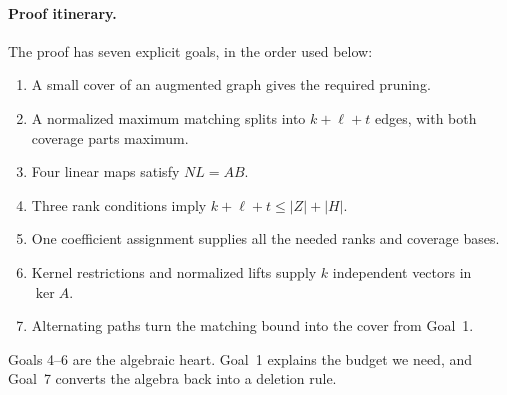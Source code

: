 \paragraph{Proof itinerary.}
The proof has seven explicit goals, in the order used below:
\begin{enumerate}[label=\arabic*.]
\item A small cover of an augmented graph gives the required pruning.
\item A normalized maximum matching splits into $k+\ell+t$ edges, with both coverage parts maximum.
\item Four linear maps satisfy $NL=AB$.
\item Three rank conditions imply $k+\ell+t\le |Z|+|H|$.
\item One coefficient assignment supplies all the needed ranks and coverage bases.
\item Kernel restrictions and normalized lifts supply $k$ independent vectors in $\ker A$.
\item Alternating paths turn the matching bound into the cover from Goal~1.
\end{enumerate}
Goals 4--6 are the algebraic heart. Goal~1 explains the budget we need,
and Goal~7 converts the algebra back into a deletion rule.

